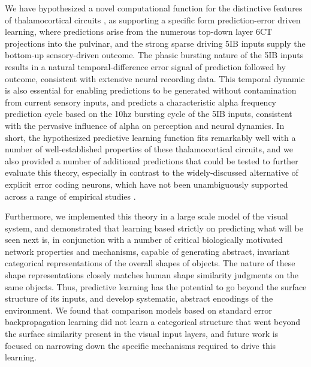 \documentclass[11pt,twoside]{article}
\newif\myifpdf
\begin{document}
We have hypothesized a novel computational function for the distinctive features of thalamocortical circuits \cite{ShermanGuillery06}, as supporting a specific form prediction-error driven learning, where predictions arise from the numerous top-down layer 6CT projections into the pulvinar, and the strong sparse driving 5IB inputs supply the bottom-up sensory-driven outcome.  The phasic bursting nature of the 5IB inputs results in a natural temporal-difference error signal of prediction followed by outcome, consistent with extensive neural recording data.  This temporal dynamic is also essential for enabling predictions to be generated without contamination from current sensory inputs, and predicts a characteristic alpha frequency prediction cycle based on the 10hz bursting cycle of the 5IB inputs, consistent with the pervasive influence of alpha on perception and neural dynamics.  In short, the hypothesized predictive learning function fits remarkably well with a number of well-established properties of these thalamocortical circuits, and we also provided a number of additional predictions that could be tested to further evaluate this theory, especially in contrast to the widely-discussed alternative of explicit error coding neurons, which have not been unambiguously supported across a range of empirical studies \cite{WalshMcGovernClarkEtAl20}.

Furthermore, we implemented this theory in a large scale model of the visual system, and demonstrated that learning based strictly on predicting what will be seen next is, in conjunction with a number of critical biologically motivated network properties and mechanisms, capable of generating abstract, invariant categorical representations of the overall shapes of objects.  The nature of these shape representations closely matches human shape similarity judgments on the same objects.  Thus, predictive learning has the potential to go beyond the surface structure of its inputs, and develop systematic, abstract encodings of the environment.   We found that comparison models based on standard error backpropagation learning did not learn a categorical structure that went beyond the surface similarity present in the visual input layers, and future work is focused on narrowing down the specific mechanisms required to drive this learning.

\end{document}
